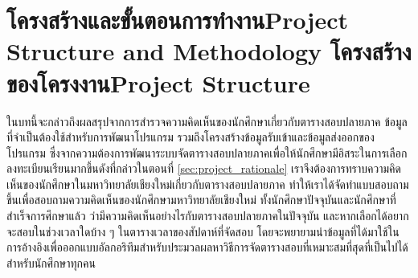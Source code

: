 \chapter{\ifproject%
\ifcpe โครงสร้างและขั้นตอนการทำงาน\else Project Structure and Methodology\fi
\else%
\ifcpe โครงสร้างของโครงงาน\else Project Structure\fi
\fi
}


\makeatletter


\makeatother
ในบทนี้จะกล่าวถึงผลสรุปจากการสํารวจความคิดเห็นของนักศึกษาเกี่ยวกับตารางสอบปลายภาค ข้อมูลที่จำเป็นต้องใช้สำหรับการพัฒนาโปรแกรม รวมถึงโครงสร้างข้อมูลรับเข้าและข้อมูลส่งออกของโปรแกรม
ซึ่งจากความต้องการพัฒนาระบบจัดตารางสอบปลายภาคเพื่อให้นักศึกษามีอิสระในการเลือกลงทะเบียนเรียนมากขึ้นดังที่กล่าวในตอนที่ \ref{sec:project_rationale} เราจึงต้องการทราบความคิดเห็นของนักศึกษาในมหาวิทยาลัยเชียงใหม่เกี่ยวกับตารางสอบปลายภาค 
ทำให้เราได้จัดทำแบบสอบถามขึ้นเพื่อสอบถามความคิดเห็นของนักศึกษามหาวิทยาลัยเชียงใหม่ ทั้งนักศึกษาปัจจุบันและนักศึกษาที่สำเร็จการศึกษาแล้ว ว่ามีความคิดเห็นอย่างไรกับตารางสอบปลายภาคในปัจจุบัน และหากเลือกได้อยากจะสอบในช่วงเวลาใดบ้าง ๆ ในตารางเวลาของสัปดาห์ที่จัดสอบ 
โดยจะพยายามนำข้อมูลที่ได้มาใช้ในการอ้างอิงเพื่อออกแบบอัลกอริทึมสำหรับประมวลผลหาวิธีการจัดตารางสอบที่เหมาะสมที่สุดที่เป็นไปได้สำหรับนักศึกษาทุกคน

